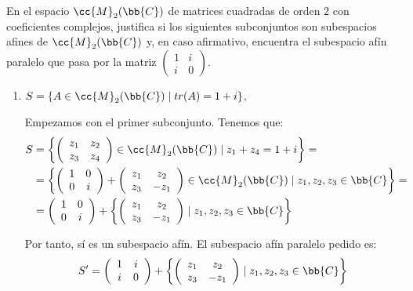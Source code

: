 \begin{ejercicio}
    En el espacio $\cc{M}_2(\bb{C})$ de matrices cuadradas de orden $2$ con coeficientes complejos, justifica si los siguientes subconjuntos son subespacios afines de $\cc{M}_2(\bb{C})$ y, en caso afirmativo, encuentra el subespacio afín paralelo que pasa por la matriz $\left(\begin{array}{cc}
        1 & i \\
        i & 0
    \end{array}\right)$.
    \begin{enumerate}
        \item $S = \{A \in \cc{M}_2(\bb{C}) \mid tr(A) = 1 + i\}$,

        Empezamos con el primer subconjunto. Tenemos que:
        \begin{equation*}\begin{split}
            S&=\left\{\left(\begin{array}{cc}
                z_1 & z_2 \\
                z_3 & z_4
            \end{array}\right) \in \cc{M}_2(\bb{C}) \mid z_1+z_4=1+i\right\}
            =\\&= \left\{\left(\begin{array}{cc}
                1 & 0 \\
                0 & i
            \end{array}\right)+\left(\begin{array}{cc}
                z_1 & z_2 \\
                z_3 & -z_1
            \end{array}\right) \in \cc{M}_2(\bb{C}) \mid z_1,z_2,z_3\in \bb{C}\right\}
            =\\&= \left(\begin{array}{cc}
                1 & 0 \\
                0 & i
            \end{array}\right) +\left\{\left(\begin{array}{cc}
                z_1 & z_2 \\
                z_3 & -z_1
            \end{array}\right)\mid z_1,z_2,z_3\in \bb{C}\right\}
        \end{split}\end{equation*}
    
        Por tanto, sí es un subespacio afín. El subespacio afín paralelo pedido es:
        $$S'= \left(\begin{array}{cc}
            1 & i \\
            i & 0
        \end{array}\right)+\left\{\left(\begin{array}{cc}
            z_1 & z_2 \\
            z_3 & -z_1
        \end{array}\right)\mid z_1,z_2,z_3\in \bb{C}\right\}$$
        

\end{enumerate}
\end{ejercicio}

